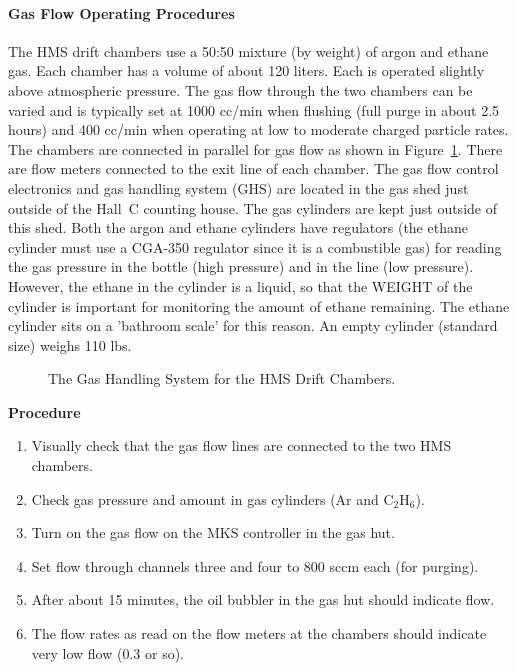 \paragraph {Gas Flow Operating Procedures}

The HMS drift chambers use a 50:50 mixture (by weight) of argon and
ethane gas.  Each chamber has a volume of about 120 liters.  Each is
operated slightly above atmospheric pressure.  The gas flow through
the two chambers can be varied and is typically set at 1000 cc/min
when flushing (full purge in about 2.5 hours) and 400 cc/min when operating
at low to moderate charged particle rates.  The chambers are connected
in parallel for gas flow as shown in Figure~\ref{fig:5.1}.  There are flow meters 
connected
to the exit line of each chamber.  The gas flow control electronics
and gas handling system (GHS) are located in the gas shed just outside
of the Hall~C counting house.  The gas cylinders are kept just outside of
this shed.  Both the argon and ethane cylinders have regulators (the ethane
cylinder must use a CGA-350 regulator since it is a combustible gas) for
reading the gas pressure in the bottle (high pressure) and in the line (low
pressure).  However, the ethane
in the cylinder is a liquid, so that the WEIGHT of the cylinder is important
for monitoring the amount of ethane remaining.  The ethane
cylinder sits on a 'bathroom scale' for this reason.  An empty cylinder
(standard size) weighs 110 lbs.

\begin{figure}
\caption{The Gas Handling System for the HMS Drift Chambers. \label{fig:5.1}}
\end{figure}

\begin{center}
{\bf Procedure}
\end{center}

\begin{enumerate}
\item {Visually check that the gas flow lines are connected to the two
HMS chambers.}
\item {Check gas pressure and amount in gas cylinders (Ar and C$_2$H$_6$).}
\item {Turn on the gas flow on the MKS controller in the gas hut.}
\item {Set flow through channels three and four to 800 sccm each
(for purging).}
\item {After about 15 minutes, the oil bubbler in the gas hut should
indicate flow.}
\item {The flow rates as read on the flow meters at the chambers should
indicate very low flow (0.3 or so).}
\end{enumerate}

